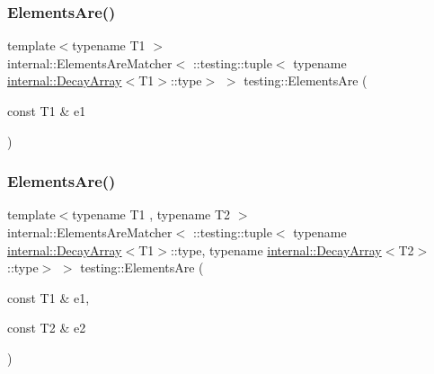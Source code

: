 \subsubsection{\texorpdfstring{ElementsAre()}{ElementsAre()}\hspace{0.1cm}{\footnotesize\ttfamily [2/11]}}
{\footnotesize\ttfamily template$<$typename T1 $>$ \\
internal\+::\+Elements\+Are\+Matcher$<$ \+::testing\+::tuple$<$ typename \mbox{\hyperlink{structtesting_1_1internal_1_1DecayArray}{internal\+::\+Decay\+Array}}$<$T1$>$\+::type$>$ $>$ testing\+::\+Elements\+Are (\begin{DoxyParamCaption}\item[{const T1 \&}]{e1 }\end{DoxyParamCaption})\hspace{0.3cm}{\ttfamily [inline]}}

\mbox{\label{namespacetesting_a864f77fe7774308d4c54f1f52f9040cf}} 
\subsubsection{\texorpdfstring{ElementsAre()}{ElementsAre()}\hspace{0.1cm}{\footnotesize\ttfamily [3/11]}}
{\footnotesize\ttfamily template$<$typename T1 , typename T2 $>$ \\
internal\+::\+Elements\+Are\+Matcher$<$ \+::testing\+::tuple$<$ typename \mbox{\hyperlink{structtesting_1_1internal_1_1DecayArray}{internal\+::\+Decay\+Array}}$<$T1$>$\+::type, typename \mbox{\hyperlink{structtesting_1_1internal_1_1DecayArray}{internal\+::\+Decay\+Array}}$<$T2$>$\+::type$>$ $>$ testing\+::\+Elements\+Are (\begin{DoxyParamCaption}\item[{const T1 \&}]{e1,  }\item[{const T2 \&}]{e2 }\end{DoxyParamCaption})\hspace{0.3cm}{\ttfamily [inline]}}

\mbox{\label{namespacetesting_a0be8a0ad5d7461fd1da13ecac4e21e2a}} 
